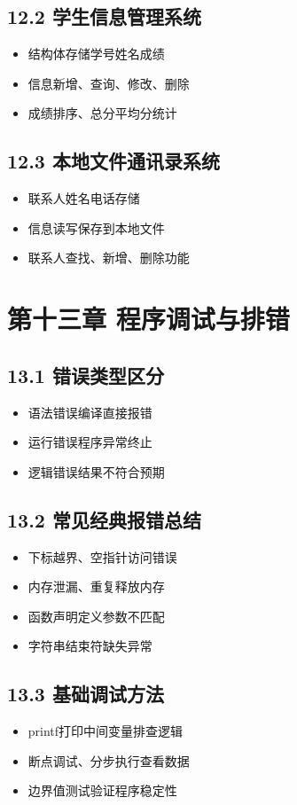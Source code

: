 \subsection{12.2 学生信息管理系统}
\begin{itemize}
\item 结构体存储学号姓名成绩
\item 信息新增、查询、修改、删除
\item 成绩排序、总分平均分统计
\end{itemize}

\subsection{12.3 本地文件通讯录系统}
\begin{itemize}
\item 联系人姓名电话存储
\item 信息读写保存到本地文件
\item 联系人查找、新增、删除功能
\end{itemize}

\section{第十三章 程序调试与排错}
\subsection{13.1 错误类型区分}
\begin{itemize}
\item 语法错误编译直接报错
\item 运行错误程序异常终止
\item 逻辑错误结果不符合预期
\end{itemize}

\subsection{13.2 常见经典报错总结}
\begin{itemize}
\item 下标越界、空指针访问错误
\item 内存泄漏、重复释放内存
\item 函数声明定义参数不匹配
\item 字符串结束符缺失异常
\end{itemize}

\subsection{13.3 基础调试方法}
\begin{itemize}
\item printf打印中间变量排查逻辑
\item 断点调试、分步执行查看数据
\item 边界值测试验证程序稳定性
\end{itemize}
